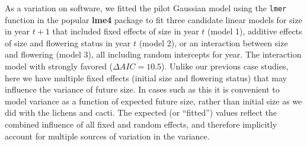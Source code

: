 \documentclass[12pt]{article}
\begin{document}
As a variation on software, we fitted the pilot Gaussian model using the \texttt{lmer} function in the popular \textbf{lme4} package to fit three candidate linear models for size in year $t+1$  that included fixed effects of size in year $t$ (model 1), additive effects of size and flowering status in year $t$ (model 2), or an interaction between size and flowering (model 3), all including random intercepts for year. 
The interaction model with strongly favored ($\Delta AIC = 10.5$). 
Unlike our previous case studies, here we have multiple fixed effects (initial size and flowering status) that may influence the variance of future size. 
In cases such as this it is convenient to model variance as a function of expected future size, rather than initial size as we did with the lichens and cacti. 
The expected (or ``fitted'') values reflect the combined influence of all fixed and random effects, and therefore implicitly account for multiple sources of variation in the variance. 
\end{document}
